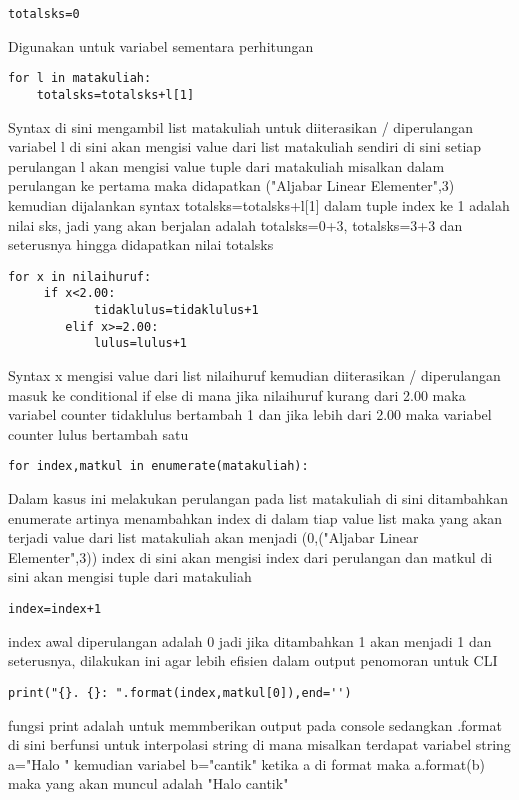 \documentclass[a4paper]{article}
\begin{document}
\begin{lstlisting}
totalsks=0 
\end{lstlisting}
Digunakan untuk variabel sementara perhitungan
\begin{lstlisting}
for l in matakuliah:
	totalsks=totalsks+l[1]
\end{lstlisting}
Syntax di sini mengambil list matakuliah untuk diiterasikan / diperulangan variabel l di sini akan mengisi value dari list matakuliah sendiri di sini setiap perulangan l akan mengisi value tuple dari matakuliah misalkan dalam perulangan ke pertama maka didapatkan ("Aljabar Linear Elementer",3) kemudian dijalankan syntax totalsks=totalsks+l[1] dalam tuple index ke 1 adalah nilai sks, jadi yang akan berjalan adalah totalsks=0+3, totalsks=3+3 dan seterusnya hingga didapatkan nilai totalsks
\begin{lstlisting}
for x in nilaihuruf:
	 if x<2.00:
            tidaklulus=tidaklulus+1
        elif x>=2.00:
            lulus=lulus+1
\end{lstlisting}
Syntax x mengisi value dari list nilaihuruf kemudian diiterasikan / diperulangan masuk ke conditional if else di mana jika nilaihuruf kurang dari 2.00 maka variabel counter tidaklulus bertambah 1 dan jika lebih dari 2.00 maka variabel counter lulus bertambah satu
\begin{lstlisting}
for index,matkul in enumerate(matakuliah):
\end{lstlisting}
Dalam kasus ini melakukan perulangan pada list matakuliah di sini ditambahkan enumerate artinya menambahkan index di dalam tiap value list maka yang akan terjadi value dari list matakuliah akan menjadi (0,("Aljabar Linear Elementer",3)) index di sini akan mengisi index dari perulangan dan matkul di sini akan mengisi tuple dari matakuliah
\begin{lstlisting}
index=index+1
\end{lstlisting}
index awal diperulangan adalah 0 jadi jika ditambahkan 1 akan menjadi 1 dan seterusnya, dilakukan ini agar lebih efisien dalam output penomoran untuk CLI
\begin{lstlisting}
print("{}. {}: ".format(index,matkul[0]),end='')
\end{lstlisting}
fungsi print adalah untuk memmberikan output pada console sedangkan .format di sini berfunsi untuk interpolasi string di mana misalkan terdapat variabel string a="Halo {}"
kemudian variabel b="cantik" ketika a di format maka a.format(b) maka yang akan muncul adalah "Halo cantik"
\end{document}
